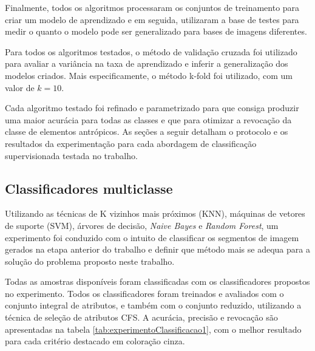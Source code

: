 Finalmente, todos os algoritmos processaram os conjuntos de treinamento para criar um modelo de aprendizado e em seguida, utilizaram a base de testes para medir o quanto o modelo pode ser generalizado para bases de imagens diferentes.

Para todos os algoritmos testados, o método de validação cruzada foi utilizado para avaliar a variância na taxa de aprendizado e inferir a generalização dos modelos criados. Mais especificamente, o método k-fold foi utilizado, com um valor de $k=10$.

Cada algoritmo testado foi refinado e parametrizado para que consiga produzir uma maior acurácia para todas as classes e que para otimizar a revocação da classe de elementos antrópicos. As seções a seguir detalham o protocolo e os resultados da experimentação para cada abordagem de classificação supervisionada testada no trabalho.

\subsection{Classificadores multiclasse}

Utilizando as técnicas de K vizinhos mais próximos (KNN), máquinas de vetores de suporte (SVM), árvores de decisão, \textit{Naive Bayes} e \textit{Random Forest}, um experimento foi conduzido com o intuito de classificar os segmentos de imagem gerados na etapa anterior do trabalho e definir que método mais se adequa para a solução do problema proposto neste trabalho.

Todas as amostras disponíveis foram classificadas com os classificadores propostos no experimento. Todos os classificadores foram treinados e avaliados com o conjunto integral de atributos, e também com o conjunto reduzido, utilizando a técnica de seleção de atributos CFS. A acurácia, precisão e revocação são apresentadas na tabela \ref{tab:experimentoClassificacao1}, com o melhor resultado para cada critério destacado em coloração cinza.

